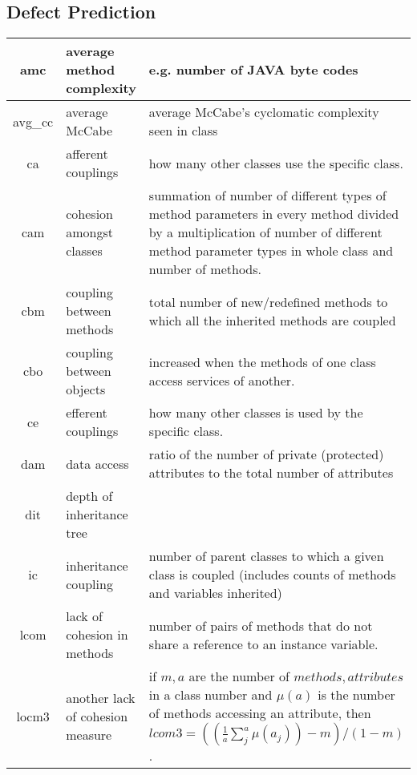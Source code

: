 \documentclass[conference]{IEEEtran}
\begin{document}
\subsection{Defect Prediction}


\begin{figure*}[htbp!]
  \renewcommand{\baselinestretch}{0.8}\begin{center}
    {\scriptsize
      \begin{tabular}{c|l|p{4.7in}}
        amc & average method complexity & e.g. number of JAVA byte codes\\\hline
        avg\_cc & average McCabe & average McCabe's cyclomatic complexity seen
        in class\\\hline
        ca & afferent couplings & how many other classes use the specific
        class. \\\hline
        cam & cohesion amongst classes & summation of number of different
        types of method parameters in every method divided by a multiplication
        of number of different method parameter types in whole class and
        number of methods. \\\hline
        cbm &coupling between methods &  total number of new/redefined methods
        to which all the inherited methods are coupled\\\hline
        cbo & coupling between objects & increased when the methods of one
        class access services of another.\\\hline
        ce & efferent couplings & how many other classes is used by the
        specific class. \\\hline
        dam & data access & ratio of the number of private (protected)
        attributes to the total number of attributes\\\hline
        dit & depth of inheritance tree &\\\hline
        ic & inheritance coupling &  number of parent classes to which a given
        class is coupled (includes counts of methods and variables inherited)
        \\\hline
        lcom & lack of cohesion in methods &number of pairs of methods that do
        not share a reference to an instance variable.\\\hline
        locm3 & another lack of cohesion measure & if $m,a$ are  the number of
        $methods,attributes$
        in a class number and $\mu(a)$  is the number of methods accessing an
        attribute, 
        then
        $lcom3=((\frac{1}{a} \sum_j^a \mu(a_j)) - m)/ (1-m)$.

\end{tabular}}
\end{center}
\end{figure*}
\end{document}
